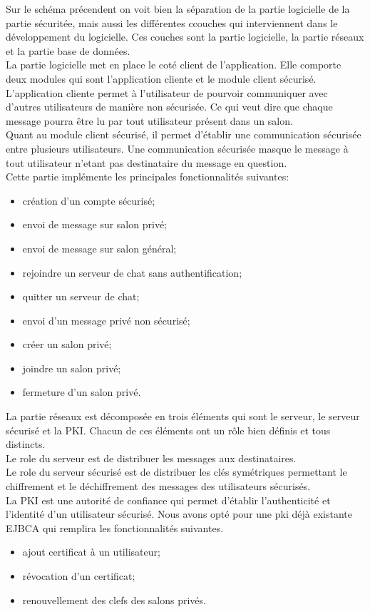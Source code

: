 \documentclass[a4paper,11pt,french]{book}
\begin{document}
Sur le schéma précendent on voit bien la séparation de la partie logicielle de la partie sécuritée, mais aussi les différentes ccouches qui interviennent dans le développement du logicielle. Ces couches sont la partie logicielle, la partie réseaux et la partie base de données.\\

La partie logicielle met en place le coté client de l'application. Elle comporte deux modules qui sont l'application cliente et le module client sécurisé. L'application cliente permet à l'utilisateur de pourvoir communiquer avec d'autres utilisateurs de manière non sécurisée. Ce qui veut dire que chaque message pourra être lu par tout utilisateur présent dans un salon.\\Quant au module client sécurisé, il permet d'établir une communication sécurisée entre plusieurs utilisateurs. Une communication sécurisée masque le message à tout utilisateur n'etant pas destinataire du message en question. \\Cette partie implémente les principales fonctionnalités suivantes:
\begin{itemize}
\item création d’un compte sécurisé;
\item envoi de message sur salon privé;
\item envoi de message sur salon général;
\item rejoindre un serveur de chat sans authentification;
\item quitter un serveur de chat;
\item envoi d’un message privé non sécurisé;
\item créer un salon privé;
\item joindre un salon privé;
\item fermeture d’un salon privé.
\end{itemize}
\vspace{.6cm}

La partie réseaux est décomposée en trois éléments qui sont le serveur, le serveur sécurisé et la PKI. Chacun de ces éléments ont un rôle bien définis et tous distincts. \\Le role du serveur est de distribuer les messages aux destinataires.\\Le role du serveur sécurisé est de distribuer les clés symétriques permettant le chiffrement et le déchiffrement des messages des utilisateurs sécurisés.\\La PKI est une autorité de confiance qui permet d'établir l'authenticité et l'identité d'un utilisateur sécurisé. Nous avons opté pour une pki déjà existante EJBCA qui remplira les fonctionnalités suivantes.
\begin{itemize}\item ajout certificat à un utilisateur;\item révocation d’un certificat;\item renouvellement des clefs des salons privés.\end{itemize}
\vspace{.6cm}
\end{document}
